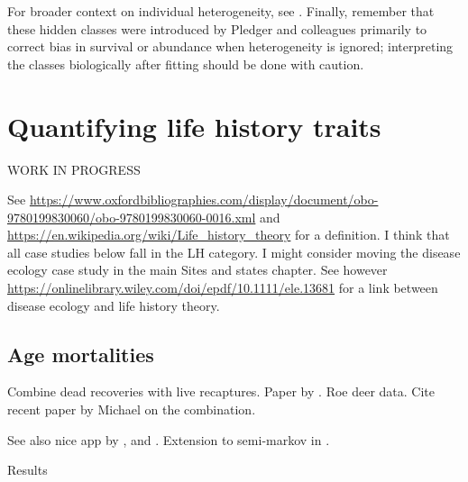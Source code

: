 \documentclass[
  12pt,
]{krantz}
\begin{document}
For broader context on individual heterogeneity, see \citet{gimenez2018ih}. Finally, remember that these hidden classes were introduced by Pledger and colleagues primarily to correct bias in survival or abundance when heterogeneity is ignored; interpreting the classes biologically after fitting should be done with caution.

\chapter{Quantifying life history traits}\label{tradeoffs}

WORK IN PROGRESS

See \url{https://www.oxfordbibliographies.com/display/document/obo-9780199830060/obo-9780199830060-0016.xml} and \url{https://en.wikipedia.org/wiki/Life_history_theory} for a definition. I think that all case studies below fall in the LH category. I might consider moving the disease ecology case study in the main Sites and states chapter. See however \url{https://onlinelibrary.wiley.com/doi/epdf/10.1111/ele.13681} for a link between disease ecology and life history theory.

\section{Age mortalities}\label{age-mortalities}

Combine dead recoveries with live recaptures. Paper by \citet{koons2014}. Roe deer data. Cite recent paper by Michael on the combination.

See also nice app by \citet{fernandez-chacon_causes_2016}, \citet{peron_evidence_2016} and \citet{marzo2011}. Extension to semi-markov in \citet{choquet_semi-markov_2011}.

Results
\end{document}
